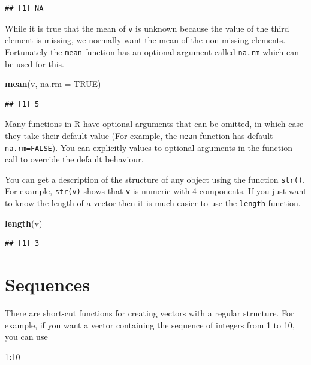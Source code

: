 \documentclass[
]{book}
\newenvironment{Shaded}{\begin{snugshade}}{\end{snugshade}}
\newcommand{\AttributeTok}[1]{\textcolor[rgb]{0.13,0.29,0.53}{#1}}
\newcommand{\ConstantTok}[1]{\textcolor[rgb]{0.56,0.35,0.01}{#1}}
\newcommand{\DecValTok}[1]{\textcolor[rgb]{0.00,0.00,0.81}{#1}}
\newcommand{\FunctionTok}[1]{\textcolor[rgb]{0.13,0.29,0.53}{\textbf{#1}}}
\newcommand{\NormalTok}[1]{#1}
\newcommand{\SpecialCharTok}[1]{\textcolor[rgb]{0.81,0.36,0.00}{\textbf{#1}}}
\begin{document}
\begin{verbatim}
## [1] NA
\end{verbatim}

While it is true that the mean of \texttt{v} is unknown because the value
of the third element is missing, we normally want the mean of the
non-missing elements. Fortunately the \texttt{mean} function has an
optional argument called \texttt{na.rm} which can be used for this.

\begin{Shaded}
\begin{Highlighting}[]
\FunctionTok{mean}\NormalTok{(v, }\AttributeTok{na.rm =} \ConstantTok{TRUE}\NormalTok{)}
\end{Highlighting}
\end{Shaded}

\begin{verbatim}
## [1] 5
\end{verbatim}

Many functions in R have optional arguments that can be omitted, in which
case they take their default value (For example, the \texttt{mean} function has
default \texttt{na.rm=FALSE}). You can explicitly values to optional arguments
in the function call to override the default behaviour.

You can get a description of the structure of any object using the
function \texttt{str()}. For example, \texttt{str(v)} shows that \texttt{v}
is numeric with 4 components. If you just want to know the length of a
vector then it is much easier to use the \texttt{length} function.

\begin{Shaded}
\begin{Highlighting}[]
\FunctionTok{length}\NormalTok{(v)}
\end{Highlighting}
\end{Shaded}

\begin{verbatim}
## [1] 3
\end{verbatim}

\section{Sequences}\label{sequences}

There are short-cut functions for creating vectors with a regular
structure. For example, if you want a vector containing the sequence of
integers from 1 to 10, you can use

\begin{Shaded}
\begin{Highlighting}[]
\DecValTok{1}\SpecialCharTok{:}\DecValTok{10}
\end{Highlighting}
\end{Shaded}
\end{document}
